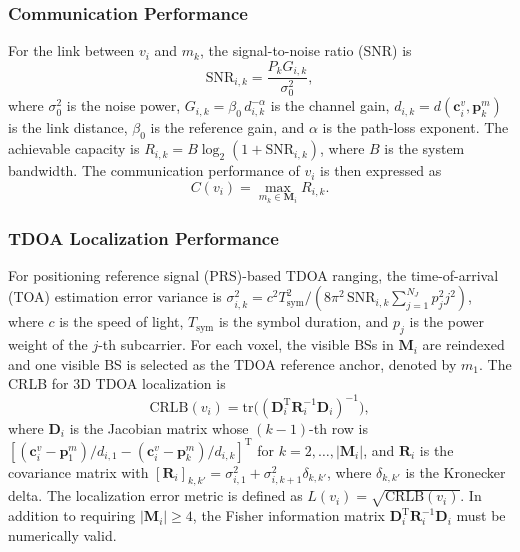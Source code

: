 \documentclass[10pt,journal,letterpaper]{IEEEtran}
\begin{document}
\subsubsection{Communication Performance}
For the link between $v_i$ and $m_k$, the signal-to-noise ratio (SNR) is
\begin{equation}
\mathrm{SNR}_{i,k}=\frac{P_kG_{i,k}}{\sigma_0^2},
\end{equation}
where $\sigma_0^2$ is the noise power, $G_{i,k}=\beta_0\,d_{i,k}^{-\alpha}$ is the channel gain, $d_{i,k}=d(\mathbf{c}_i^v,\mathbf{p}_k^m)$ is the link distance, $\beta_0$ is the reference gain, and $\alpha$ is the path-loss exponent. The achievable capacity is $R_{i,k}=B\log_2(1+\mathrm{SNR}_{i,k})$, where $B$ is the system bandwidth. The communication performance of $v_i$ is then expressed as
\begin{equation}
C(v_i)=\max_{m_k\in\mathbf{M}_i}R_{i,k}.
\end{equation}

\subsubsection{TDOA Localization Performance}
For positioning reference signal (PRS)-based TDOA ranging, the time-of-arrival (TOA) estimation error variance is $\sigma_{i,k}^2=c^2T_{\mathrm{sym}}^2/(8\pi^2\,\mathrm{SNR}_{i,k}\sum_{j=1}^{N_J}p_j^2j^2)$, where $c$ is the speed of light, $T_{\mathrm{sym}}$ is the symbol duration, and $p_j$ is the power weight of the $j$-th subcarrier. For each voxel, the visible BSs in $\mathbf{M}_i$ are reindexed and one visible BS is selected as the TDOA reference anchor, denoted by $m_1$. The CRLB for 3D TDOA localization is~\cite{ref12}
\begin{equation}
\mathrm{CRLB}(v_i)=\mathrm{tr}\big((\mathbf{D}_i^{\mathrm{T}}\mathbf{R}_i^{-1}\mathbf{D}_i)^{-1}\big),
\end{equation}
where $\mathbf{D}_i$ is the Jacobian matrix whose $(k-1)$-th row is $[(\mathbf{c}_i^v-\mathbf{p}_1^m)/d_{i,1}-(\mathbf{c}_i^v-\mathbf{p}_k^m)/d_{i,k}]^{\mathrm{T}}$ for $k=2,\ldots,|\mathbf{M}_i|$, and $\mathbf{R}_i$ is the covariance matrix with $[\mathbf{R}_i]_{k,k'}=\sigma_{i,1}^2+\sigma_{i,k+1}^2\delta_{k,k'}$, where $\delta_{k,k'}$ is the Kronecker delta. The localization error metric is defined as $L(v_i)=\sqrt{\mathrm{CRLB}(v_i)}$. In addition to requiring $|\mathbf{M}_i|\ge4$, the Fisher information matrix $\mathbf{D}_i^{\mathrm{T}}\mathbf{R}_i^{-1}\mathbf{D}_i$ must be numerically valid.
\end{document}
